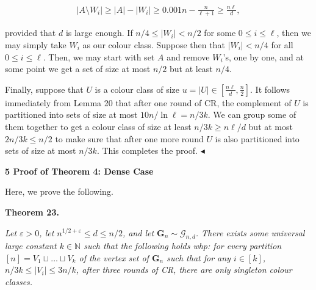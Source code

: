 \documentclass[10pt,a4paper]{article}
\begin{document}
\[\begin{gathered}
|A\setminus W_{i}|\geq|A|-|W_{i}|\geq 0.001n-\frac{n}{\ell+1}\geq\frac{n\ell}{d},
\end{gathered}\]


provided that $d$ is large enough. If $n/4\leq|W_{i}|<n/2$ for some $0\leq i\leq\ell$, then we may simply take $W_{i}$ as our colour class. Suppose then that $|W_{i}|<n/4$ for all $0\leq i\leq\ell$. Then, we may start with set $A$ and remove $W_{i}$’s, one by one, and at some point we get a set of size at most $n/2$ but at least $n/4$.\par




Finally, suppose that $U$ is a colour class of size $u=|U|\in[\frac{n\ell}{d},\frac{n}{2}]$. It follows immediately from Lemma 20 that after one round of CR, the complement of $U$ is partitioned into sets of size at most $10n/\ln\ell=n/3k$. We can group some of them together to get a colour class of size at least $n/3k\geq n\ell/d$ but at most $2n/3k\leq n/2$ to make sure that after one more round $U$ is also partitioned into sets of size at most $n/3k$. This completes the proof.
$\blacktriangleleft$\par







\par\medskip\noindent\textbf{
5 Proof of Theorem 4: Dense Case}\par




Here, we prove the following.\par





\par\medskip\noindent\textbf{
\textbf{Theorem 23}\textbf{.}
}\par



\emph{Let $\varepsilon>0$, let $n^{1/2+\varepsilon}\leq d\leq n/2$, and let $\mathbf{G}_{n}\sim\mathcal{G}_{n,d}$.
There exists some universal large constant $k\in\mathbb{N}$ such that the following holds whp: for every partition $[n]=V_{1}\sqcup\ldots\sqcup V_{k}$ of the vertex set of $\mathbf{G}_{n}$ such that for any $i\in[k]$, $n/3k\leq|V_{i}|\leq 3n/k$, after three rounds of CR, there are only singleton colour classes.}\par
\end{document}
